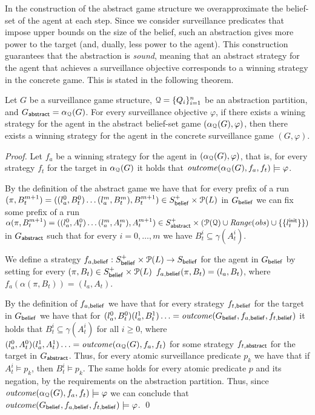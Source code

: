 In the construction of the abstract  game structure we overapproximate the belief-set of the agent at each step. Since we consider surveillance predicates that impose upper bounds on the size of the belief, such an abstraction  gives more power to the target (and, dually, less power to the agent).  This construction guarantees that the abstraction is \emph{sound}, meaning that an abstract strategy for the agent that achieves a surveillance objective corresponds to a winning strategy in the concrete game. This is stated in the following theorem.

\begin{thm}
Let $G$ be a surveillance game structure, $\mathcal{Q} = \{Q_i\}_{i=1}^n$ be an abstraction partition, and $G_{\mathsf{abstract}} = \alpha_{\mathcal{Q}}(G)$. For every surveillance objective $\varphi$, if there exists a wining strategy for the agent in the abstract belief-set game $(\alpha_{\mathcal{Q}}(G),\varphi)$, then there exists a winning strategy for the agent in the concrete surveillance game $(G,\varphi)$.
\end{thm}
{\it Proof.} Let $f_a$ be a winning strategy for the agent in $(\alpha_{\mathcal{Q}}(G),\varphi)$, that is, for every strategy $f_t$ for the target in $\alpha_{\mathcal{Q}}(G)$ it holds that $\mathit{outcome}(\alpha_{\mathcal{Q}}(G),f_a,f_t) \models \varphi$.

By the definition of the abstract game we have that for every prefix of a run $(\pi,B_t^{m+1}) = ((l_a^0,B_t^0)\ldots (l_a^m,B_t^m), B_t^{m+1})\in S_{\mathsf{belief}}^+ \times \mathcal{P}(L)$ in $G_{\mathsf{belief}}$ we can fix some prefix of a run $\alpha(\pi,B_t^{m+1}) = ((l_a^0,A_t^0)\ldots (l_a^m,A_t^m), A_t^{m+1}) \in S_{\mathsf{abstract}}^+ \times (\mathcal P(\mathcal{Q}) \cup \mathit{Range}(\mathit{obs}) \cup \{\{l_t^{\mathsf{init}}\}\})$ in $G_{\mathsf{abstract}}$ such that for every $i = 0,\ldots, m$ we have $B_t^i \subseteq  \gamma(A_t^i)$.

We define a strategy $f_{a,\mathsf{belief}} : S_{\mathsf{belief}}^+ \times \mathcal{P}(L) \to S_{\mathsf{belief}}$ for the agent in $G_{\mathsf{belief}}$ by setting for every $(\pi,B_t)\in S_{\mathsf{belief}}^+ \times \mathcal{P}(L)$ $f_{a,\mathsf{belief}}(\pi,B_t) = (l_a,B_t)$, where $f_a(\alpha(\pi,B_t))=(l_a,A_t)$.

By the definition of $f_{a,\mathsf{belief}}$ we have that for every strategy $f_{t,\mathsf{belief}}$ for the target in $G_{\mathsf{belief}}$ we have that for  $(l_a^0,B_t^0)(l_a^1,B_t^1)\ldots =  \mathit{outcome}(G_{\mathsf{belief}},f_{a,\mathsf{belief}},f_{t,\mathsf{belief}})$ it holds that $B_t^i \subseteq \gamma(A_t^i)$ for all $i \geq 0$, where $(l_a^0,A_t^0)(l_a^1,A_t^1)\ldots =  \mathit{outcome}(\alpha_{\mathcal{Q}}(G),f_a,f_t)$ for some strategy $f_{t,\mathsf{abstract}}$ for the target in $G_{\mathsf{abstract}}$. Thus,
for every atomic surveillance predicate $p_k$ we have that if $A_t^i \models p_k$, then $B_t^i \models p_k$. The same holds for every atomic predicate $p$ and its negation, by the requirements on the abstraction partition. Thus, since $\mathit{outcome}(\alpha_{\mathcal{Q}}(G),f_a,f_t) \models \varphi$ we can conclude that $\mathit{outcome}(G_{\mathsf{belief}},f_{a,\mathsf{belief}},f_{t,\mathsf{belief}}) \models \varphi$.
\qed

